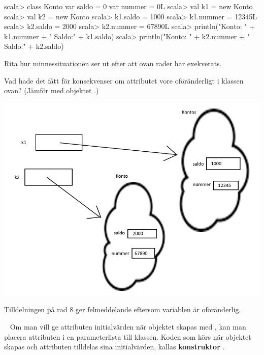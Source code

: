 \begin{REPL}
scala> class Konto {
         var saldo = 0
         var nummer = 0L
       }
scala> val k1 = new Konto
scala> val k2 = new Konto
scala> k1.saldo = 1000
scala> k1.nummer = 12345L
scala> k2.saldo = 2000
scala> k2.nummer = 67890L
scala> println("Konto: " + k1.nummer + " Saldo:" + k1.saldo)
scala> println("Konto: " + k2.nummer + " Saldo:" + k2.saldo)
\end{REPL}

\Subtask\Pen Rita hur minnessituationen ser ut efter att ovan rader har exekverats.

\Subtask\Pen Vad hade det fått för konsekvenser om attributet  vore oföränderligt i klassen ovan? (Jämför med objektet .)


\SOLUTION


\TaskSolved \what
 

\SubtaskSolved   \includegraphics[scale=0.5]{../img/w04-solutions/uppgift-3a}

\SubtaskSolved 
Tilldelningen på rad 8  ger felmeddelande eftersom variablen är oföränderlig.


\QUESTEND









\QUESTBEGIN

\Task  \what~  Om man vill ge attributen initialvärden när objektet skapas med , kan man placera attributen i en parameterlista till klassen. Koden som körs när objektet skapas och attributen tilldelas sina initialvärden, kallas \textbf{konstruktor} .

